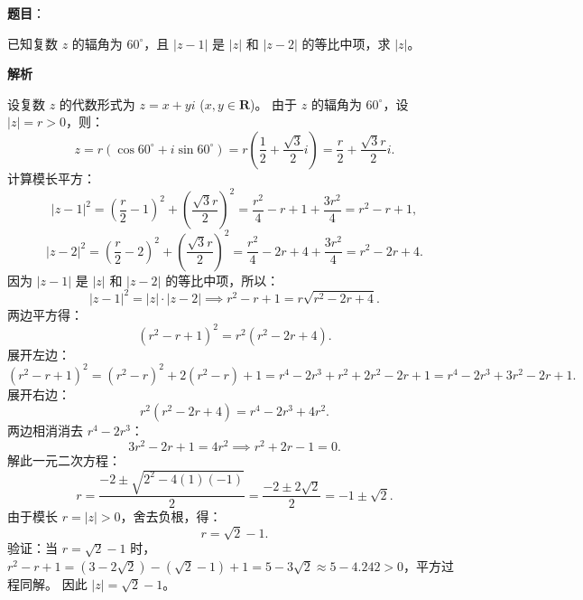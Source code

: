 \begin{answer}


\end{answer}
\begin{answer}

\textbf{题目}：

已知复数 $z$ 的辐角为 $60^\circ$，且 $|z - 1|$ 是 $|z|$ 和 $|z - 2|$ 的等比中项，求 $|z|$。

\textbf{解析}

设复数 $z$ 的代数形式为 $z = x + yi$ ($x, y \in \mathbf{R}$)。
由于 $z$ 的辐角为 $60^\circ$，设 $|z| = r > 0$，则：
\nopagebreak[4]
\[z = r(\cos 60^\circ + i\sin 60^\circ) = r\left(\frac{1}{2} + \frac{\sqrt{3}}{2}i\right) = \frac{r}{2} + \frac{\sqrt{3}r}{2}i.\]
计算模长平方：
\nopagebreak[4]
\[|z - 1|^2 = \left(\frac{r}{2} - 1\right)^2 + \left(\frac{\sqrt{3}r}{2}\right)^2 = \frac{r^2}{4} - r + 1 + \frac{3r^2}{4} = r^2 - r + 1,\]
\nopagebreak[4]
\[|z - 2|^2 = \left(\frac{r}{2} - 2\right)^2 + \left(\frac{\sqrt{3}r}{2}\right)^2 = \frac{r^2}{4} - 2r + 4 + \frac{3r^2}{4} = r^2 - 2r + 4.\]
因为 $|z - 1|$ 是 $|z|$ 和 $|z - 2|$ 的等比中项，所以：
\nopagebreak[4]
\[|z - 1|^2 = |z| \cdot |z - 2| \implies r^2 - r + 1 = r\sqrt{r^2 - 2r + 4}.\]
两边平方得：
\nopagebreak[4]
\[(r^2 - r + 1)^2 = r^2(r^2 - 2r + 4).\]
展开左边：
\nopagebreak[4]
\[(r^2 - r + 1)^2 = (r^2 - r)^2 + 2(r^2 - r) + 1 = r^4 - 2r^3 + r^2 + 2r^2 - 2r + 1 = r^4 - 2r^3 + 3r^2 - 2r + 1.\]
展开右边：
\nopagebreak[4]
\[r^2(r^2 - 2r + 4) = r^4 - 2r^3 + 4r^2.\]
两边相消消去 $r^4 - 2r^3$：
\nopagebreak[4]
\[3r^2 - 2r + 1 = 4r^2 \implies r^2 + 2r - 1 = 0.\]
解此一元二次方程：
\nopagebreak[4]
\[r = \frac{-2 \pm \sqrt{2^2 - 4(1)(-1)}}{2} = \frac{-2 \pm 2\sqrt{2}}{2} = -1 \pm \sqrt{2}.\]
由于模长 $r = |z| > 0$，舍去负根，得：
\nopagebreak[4]
\[r = \sqrt{2} - 1.\]
验证：当 $r = \sqrt{2} - 1$ 时，$r^2 - r + 1 = (3 - 2\sqrt{2}) - (\sqrt{2} - 1) + 1 = 5 - 3\sqrt{2} \approx 5 - 4.242 > 0$，平方过程同解。
因此 $|z| = \sqrt{2} - 1$。


\end{answer}
